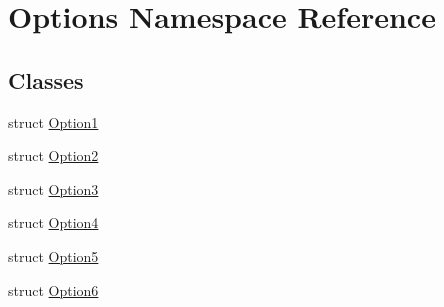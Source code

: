 \hypertarget{namespaceOptions}{
\section{Options Namespace Reference}
\label{namespaceOptions}
}


\subsection*{Classes}
\begin{CompactItemize}
\item 
struct \hyperlink{structOptions_1_1Option1}{Option1}
\item 
struct \hyperlink{structOptions_1_1Option2}{Option2}
\item 
struct \hyperlink{structOptions_1_1Option3}{Option3}
\item 
struct \hyperlink{structOptions_1_1Option4}{Option4}
\item 
struct \hyperlink{structOptions_1_1Option5}{Option5}
\item 
struct \hyperlink{structOptions_1_1Option6}{Option6}
\end{CompactItemize}
